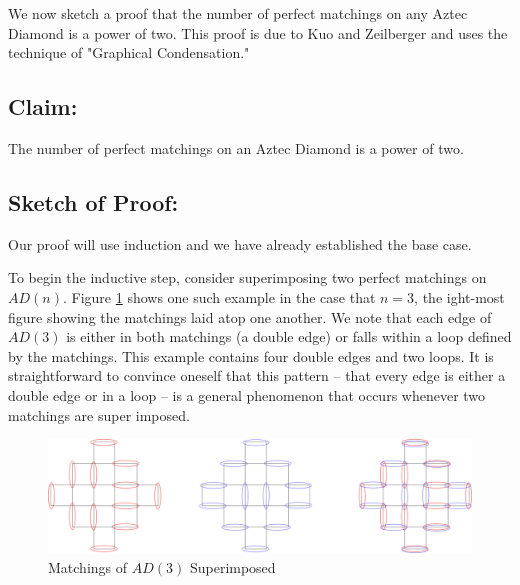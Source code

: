 \documentclass{article}
\begin{document}
\hspace{1cm} We now sketch a proof that the number of perfect matchings on any Aztec Diamond is a power of two. This proof is due to Kuo and Zeilberger and uses the technique of "Graphical Condensation."

\newpage



\subsection*{Claim:} The number of perfect matchings on an Aztec Diamond is a power of two. 

\vspace{1cm}

\subsection*{Sketch of Proof:} 

\hspace{1cm} Our proof will use induction and we have already established the base case. 

To begin the inductive step, consider superimposing two perfect matchings on $AD(n)$. Figure \ref{fig:super} shows one such example in the case that $n = 3$, the ight-most figure showing the matchings laid atop one another. We note that each edge of $AD(3)$ is either in both matchings (a double edge) or falls within a loop defined by the matchings. This example contains four double edges and two loops. It is straightforward to convince oneself that this pattern -- that every edge is either a double edge or in a loop -- is a general phenomenon that occurs whenever two matchings are super imposed. 

\begin{figure}[h]
	\begin{center}
 	\includegraphics[width=1.2\textwidth]{super_tilings.png}
  	\caption{Matchings of $AD(3)$ Superimposed}
	 \label{fig:super}
 	 \end{center}
\end{figure} 
\end{document}
